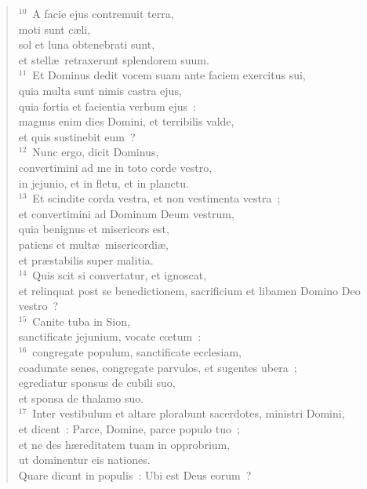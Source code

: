 \begin{flushleft}
\begin{verse}
${}^{10}$~A facie ejus contremuit terra,\\ moti sunt c\ae li,\\ sol et luna obtenebrati sunt,\\ et stell\ae\ retraxerunt splendorem suum.\\
${}^{11}$~Et Dominus dedit vocem suam ante faciem exercitus sui,\\ quia multa sunt nimis castra ejus,\\ quia fortia et facientia verbum ejus~:\\ magnus enim dies Domini, et terribilis valde,\\ et quis sustinebit eum~?\\
${}^{12}$~Nunc ergo, dicit Dominus,\\ convertimini ad me in toto corde vestro,\\ in jejunio, et in fletu, et in planctu.\\
${}^{13}$~Et scindite corda vestra, et non vestimenta vestra~;\\ et convertimini ad Dominum Deum vestrum,\\ quia benignus et misericors est,\\ patiens et mult\ae\ misericordi\ae ,\\ et pr\ae stabilis super malitia.\\
${}^{14}$~Quis scit si convertatur, et ignoscat,\\ et relinquat post se benedictionem, sacrificium et libamen Domino Deo vestro~?\\
${}^{15}$~Canite tuba in Sion,\\ sanctificate jejunium, vocate cœtum~:\\
${}^{16}$~congregate populum, sanctificate ecclesiam,\\ coadunate senes, congregate parvulos, et sugentes ubera~;\\ egrediatur sponsus de cubili suo,\\ et sponsa de thalamo suo.\\
${}^{17}$~Inter vestibulum et altare plorabunt sacerdotes, ministri Domini,\\ et dicent~: Parce, Domine, parce populo tuo~;\\ et ne des h\ae reditatem tuam in opprobrium,\\ ut dominentur eis nationes.\\ Quare dicunt in populis~: Ubi est Deus eorum~?\end{verse}\end{flushleft}


